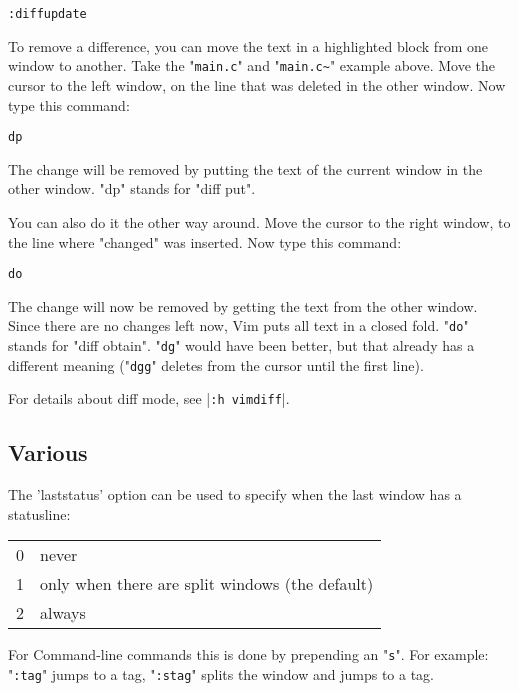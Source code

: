  \begin{Verbatim}[samepage=true]
 :diffupdate
 \end{Verbatim}

To remove a difference, you can move the text in a highlighted block from one window to another.
Take the "\verb!main.c!" and "\verb!main.c~!" example above.
Move the cursor to the left window, on the line that was deleted in the other window.
Now type this command:

 \begin{Verbatim}[samepage=true]
 dp
 \end{Verbatim}

The change will be removed by putting the text of the current window in the other window.
"dp" stands for "diff put".

You can also do it the other way around.
Move the cursor to the right window, to the line where "changed" was inserted.
Now type this command:

 \begin{Verbatim}[samepage=true]
 do
 \end{Verbatim}

The change will now be removed by getting the text from the other window.
Since there are no changes left now, Vim puts all text in a closed fold.
"\verb!do!" stands for "diff obtain".
"\verb!dg!" would have been better, but that already has a different meaning ("\verb!dgg!" deletes from the cursor until the first line).

For details about diff mode, see |\verb!:h vimdiff!|.
\subsection{Various}
The 'laststatus' option can be used to specify when the last window has a statusline:

\begin{center}
				\begin{longtable}{c l}
								0 & never\\
								1 & only when there are split windows (the default)\\
								2 & always\\
				\end{longtable}
\end{center}

For Command-line commands this is done by prepending an "\verb!s!".
For example: "\verb!:tag!" jumps to a tag, "\verb!:stag!" splits the window and jumps to a tag.

